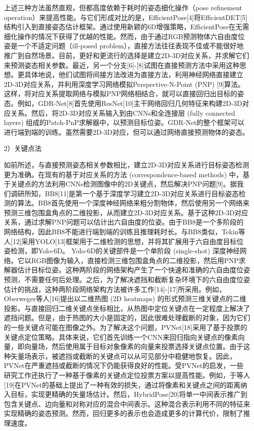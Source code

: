 \documentclass[12pt]{article}
\begin{document}
上述三种方法虽然直观，但都高度依赖于耗时的姿态细化操作（pose refinement operation）来提高性能。与它们形成对比的是，EfficientPose[4]将EfficientDET[5]结构引入到直接姿态估计框架。通过使用新颖的6D增强策略，EfficientPose在无需细化操作的情况下获得了优越的性能。然而，由于通过RGB预测物体六自由度位姿是一个不适定问题（ill-posed problem），直接方法往往表现不佳或不能很好地推广到自然场景。目前，更好和更流行的选择是建立2D-3D对应关系，并求解它们来预测姿态相关参数。最近，另一个分支[6]-[8]试图在直接预测方法中采用这种思想。更具体地说，他们试图将间接方法改进为直接方法，利用神经网络直接建立2D-3D对应关系，并利用深度学习网络模拟Perspective-N-Point (PNP) [9]算法。这样，将对应关系提取网络与模拟PNP网络相结合，就可以直接回归出目标的姿态。例如，GDR-Net[8]首先使用ResNet[10]主干网络回归几何特征来构建2D-3D对应关系。然后，将2D-3D对应关系输入到由CNNs和全连接层 (fully connected layers) 组成的Patch-PnP求解器中，以预测目标位姿。GDR-Net的整个框架可以进行端到端的训练。虽然需要2D-3D对应，但可以通过网络直接预测物体的姿态。

2）关键点法

如前所述，与直接预测姿态相关参数相比，建立2D-3D对应关系进行目标姿态检测更为准确。在现有的基于对应关系的方法 (correspondence-based methods) 中，基于关键点的方法利用CNNs检测图像中的2D关键点，然后解决PNP问题[9]。据我们调研所知，BB8[11]是第一个基于深度学习建立2D-3D对应关系进行目标姿态检测的算法。BB8首先使用一个深度神经网络来粗分割物体，然后使用另一个网络来预测三维包围盒角点的二维投影，从而建立2D-3D对应关系。基于这种2D-3D对应关系，通过求解PNP问题可以估计出六自由度的位姿。由于BB8是一个多阶段的网络结构，因此BB8不能进行端到端的训练且推理耗时长。与BB8类似，Tekin等人[12]采用YOLO[13]框架用于二维检测的思想，并将其扩展用于六自由度目标位姿检测，即Yolo-6D。 Yolo-6D的关键部件是一个单阶段 (single-shot) 深度神经网络。它以RGB图像为输入，直接检测三维包围盒角点的二维投影，然后用PNP求解器估计目标位姿。这种两阶段的网络架构产生了一个快速和准确的六自由度位姿预测，不需要任何后处理。之后，为了解决遮挡和截断复杂环境下的六自由度位姿估计的挑战，这种两阶段网络架构方法被许多工作[14]-[17]所采用。例如，Oberweger等人[16]提出以二维热图 (2D heatmaps) 的形式预测三维关键点的二维投影。与直接回归二维关键点坐标相比，从热图中定位关键点在一定程度上解决了遮挡问题。但是，由于热图的大小是固定的，因此很难处理截断的对象，因为它们的一些关键点可能在图像之外。为了解决这个问题，PVNet[18]采用了基于投票的关键点定位策略。具体来说，它们首先训练一个CNN来回归指向关键点的像素向量，即向量场，然后使用属于目标对象像素的向量来投票选择关键点位置。由于这种矢量场表示，被遮挡或截断的关键点可以从可见部分中稳健地恢复。因此，PVNet在严重遮挡或截断的情况下仍能获得良好的性能。受PVNet的启发，一些研究工作还执行了一种基于像素的关键点定位投票方案以提高性能。例如，于等人[19]在PVNet的基础上提出了一种有效的损失，通过将像素和关键点之间的距离纳入目标，实现更精确的矢量场估计。然后，HybridPose[20]将单一中间表示推广到包含关键点、边向量和对称对应的混合中间表示。这种混合表示利用不同的特征来实现精确的姿态预测。然而，回归更多的表示也会造成更多的计算代价，限制了推理速度。
\end{document}
